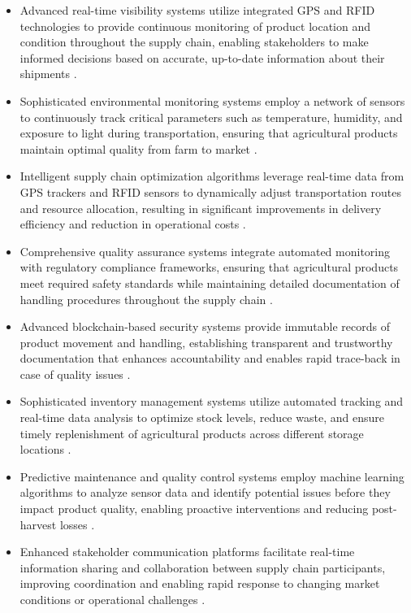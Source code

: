\documentclass[conference]{IEEEtran}
\begin{document}
\begin{itemize}
    \item Advanced real-time visibility systems utilize integrated GPS and RFID technologies to provide continuous monitoring of product location and condition throughout the supply chain, enabling stakeholders to make informed decisions based on accurate, up-to-date information about their shipments \cite{xu2023novel}.
    
    \item Sophisticated environmental monitoring systems employ a network of sensors to continuously track critical parameters such as temperature, humidity, and exposure to light during transportation, ensuring that agricultural products maintain optimal quality from farm to market \cite{ahmed2024optimized}.
    
    \item Intelligent supply chain optimization algorithms leverage real-time data from GPS trackers and RFID sensors to dynamically adjust transportation routes and resource allocation, resulting in significant improvements in delivery efficiency and reduction in operational costs \cite{makario2021bluetooth}.
    
    \item Comprehensive quality assurance systems integrate automated monitoring with regulatory compliance frameworks, ensuring that agricultural products meet required safety standards while maintaining detailed documentation of handling procedures throughout the supply chain \cite{rosero2023smart}.
    
    \item Advanced blockchain-based security systems provide immutable records of product movement and handling, establishing transparent and trustworthy documentation that enhances accountability and enables rapid trace-back in case of quality issues \cite{al2021prochain}.
    
    \item Sophisticated inventory management systems utilize automated tracking and real-time data analysis to optimize stock levels, reduce waste, and ensure timely replenishment of agricultural products across different storage locations \cite{tharatipyakul2021user}.
    
    \item Predictive maintenance and quality control systems employ machine learning algorithms to analyze sensor data and identify potential issues before they impact product quality, enabling proactive interventions and reducing post-harvest losses \cite{hernandez2024implementation}.
    
    \item Enhanced stakeholder communication platforms facilitate real-time information sharing and collaboration between supply chain participants, improving coordination and enabling rapid response to changing market conditions or operational challenges \cite{visconti2020development}.
\end{itemize}
\end{document}
